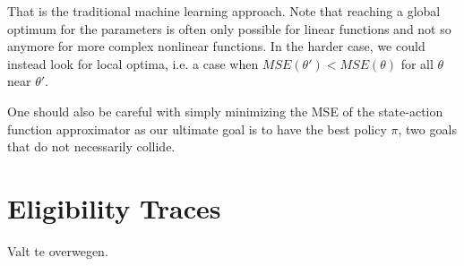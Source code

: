 That is the traditional machine learning approach.
Note that reaching a global optimum for the parameters
is often only possible for linear functions
and not so anymore for more complex nonlinear functions.
In the harder case, we could instead look for local optima,
i.e. a case when $MSE(\theta') < MSE(\theta)$
for all $\theta$ near $\theta'$.

One should also be careful with simply minimizing the MSE
of the state-action function approximator
as our ultimate goal is to have the best policy $\pi$,
two goals that do not necessarily collide.


\section{Eligibility Traces}
Valt te overwegen.
